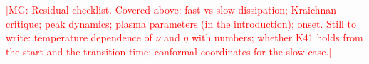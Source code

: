 \documentclass[prd,twocolumn,aps,psfig,nobibnotes,superscriptaddress,preprintnumbers,times]{revtex4}
\newcommand{\mg}[1]{{\textcolor{red}{{[MG: #1]}}}}
\begin{document}
\mg{Residual checklist. Covered above: fast-vs-slow dissipation; Kraichnan critique; peak
dynamics; plasma parameters (in the introduction); onset. Still to write: temperature
dependence of $\nu$ and $\eta$ with numbers; whether K41 holds from the start and the
transition time; conformal coordinates for the slow case.}



\end{document}
